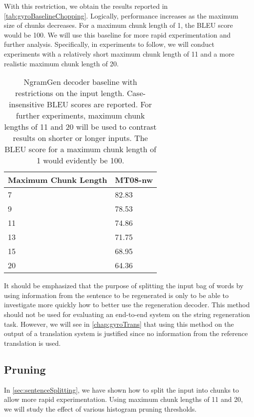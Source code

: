 With this restriction, we obtain the results reported
in \autoref{tab:gyroBaselineChopping}. Logically, performance
increases as the maximum size of chunks decreases.
For a maximum chunk length of 1, the BLEU score would be 100.
We will use this baseline
for more rapid experimentation and further analysis.
Specifically, in experiments to follow,
we will conduct experiments with a relatively short maximum chunk
length of 11 and a more realistic maximum chunk length of 20.
%
\begin{table}
  \begin{center}
  \begin{tabular}{l|l}
    Maximum Chunk Length & MT08-nw \\
    \hline
     7 & 82.83 \\
     9 & 78.53 \\
     11 & 74.86 \\
     13 & 71.75 \\
     15 & 68.95 \\
     20 & 64.36 \\
  \end{tabular}
  \caption{NgramGen decoder baseline with restrictions on the input length.
    Case-insensitive BLEU scores are reported. For further experiments, maximum
    chunk lengths of 11 and 20 will be used to contrast results on shorter or longer
    inputs. The BLEU score for a maximum chunk length of 1 would evidently be 100.}
  \label{tab:gyroBaselineChopping}
  \end{center}
\end{table}
%

It should be emphasized that the purpose of splitting the input bag of words by using
information from the sentence to be regenerated is only to be able
to investigate more quickly how to better use the regeneration decoder. This
method should not be used for evaluating an end-to-end system on the string regeneration
task. However, we will see in \autoref{chap:gyroTrans} that using this method
on the output of a translation system is justified since no information from the reference
translation is used.

\subsection{Pruning}
\label{sec:gyroPruning}

In \autoref{sec:sentenceSplitting}, we have shown how to split the input
into chunks to allow more rapid experimentation. Using maximum chunk lengths
of 11 and 20, we will study the effect of various histogram pruning
thresholds.


